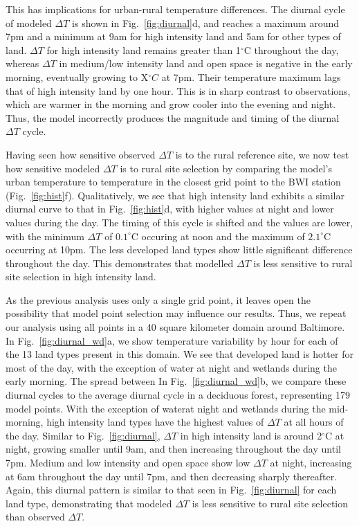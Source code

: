 \documentclass[draft,linenumbers]{agujournal}
\begin{document}
 This has implications for urban-rural temperature differences. The diurnal cycle of modeled $\Delta T$ is shown in Fig.~\ref{fig:diurnal}d, and reaches a maximum around 7pm and a minimum at 9am for high intensity land and 5am for other types of land. $\Delta T$ for high intensity land remains greater than 1$^\circ$C throughout the day, whereas $\Delta T$ in medium/low intensity land and open space is negative in the early morning, eventually growing to X$^\circ C$ at 7pm. Their temperature maximum lags that of high intensity land by one hour. This is in sharp contrast to observations, which are warmer in the morning and grow cooler into the evening and night. Thus, the model incorrectly produces the magnitude and timing of the diurnal $\Delta T$ cycle. %
 
Having seen how sensitive observed $\Delta T$ is to the rural reference site, we now test how sensitive modeled $\Delta T$ is to rural site selection by comparing the model's urban temperature to temperature in the closest grid point to the BWI station (Fig.~\ref{fig:hist}f).
Qualitatively, we see that high intensity land exhibits a similar diurnal curve to that in Fig.~\ref{fig:hist}d, with higher values at night and lower values during the day. The timing of this cycle is shifted and the values are lower, with the minimum $\Delta T$ of $0.1^\circ$C occuring at noon and the maximum of $2.1^\circ$C occurring at 10pm. The less developed land types show little significant difference throughout the day. 
This demonstrates that modelled $\Delta T$ is less sensitive to rural site selection in high intensity land. 

As the previous analysis uses only a single grid point, it leaves open the possibility that model point selection may influence our results. Thus, we repeat our analysis using all points in a 40 square kilometer domain around Baltimore. In Fig.~\ref{fig:diurnal_wd}a, we show temperature variability by hour for each of the 13 land types present in this domain. We see that developed land is hotter for most of the day, with the exception of water at night and wetlands during the early morning. The spread between 
In Fig.~\ref{fig:diurnal_wd}b, we compare these diurnal cycles to the average diurnal cycle in a deciduous forest, representing 179 model points. With the exception of waterat night and wetlands during the mid-morning, high intensity land types have the highest values of $\Delta T$ at all hours of the day. Similar to Fig.~\ref{fig:diurnal}, $\Delta T$ in high intensity land is around 2$^\circ$C at night, growing smaller until 9am, and then increasing throughout the day until 7pm. Medium and low intensity and open space show low $\Delta T$ at night, increasing at 6am throughout the day until 7pm, and then decreasing sharply thereafter. Again, this diurnal pattern is similar to that seen in Fig.~\ref{fig:diurnal} for each land type, demonstrating that modeled $\Delta T$ is less sensitive to rural site selection than observed $\Delta T$. 
 
\end{document}
